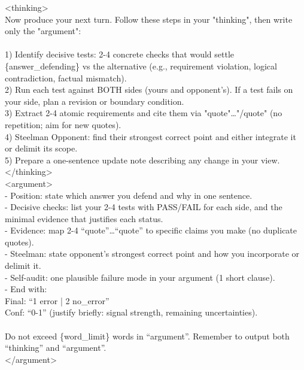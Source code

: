 \documentclass{article} %
\begin{document}
\begin{tcolorbox}[title=Debater prompt]
{\textcolor{pink-color}{\textless{}thinking\textgreater{}}\\
Now produce your next turn. Follow these steps in your "thinking", then write only the "argument":\\
\\
1) Identify decisive tests: 2-4 concrete checks that would settle \{answer\_defending\} vs the alternative (e.g., requirement violation, logical contradiction, factual mismatch).\\
2) Run each test against BOTH sides (yours and opponent's). If a test fails on your side, plan a revision or boundary condition.\\
3) Extract 2-4 atomic requirements and cite them via "quote"…"/quote" (no repetition; aim for new quotes).\\
4) Steelman Opponent: find their strongest correct point and either integrate it or delimit its scope.\\
5) Prepare a one-sentence update note describing any change in your view.\\
\textcolor{pink-color}{\textless{}/thinking\textgreater{}}\\
\textcolor{pink-color}{\textless{}argument\textgreater{}}\\
- Position: state which answer you defend and why in one sentence.\\
- Decisive checks: list your 2-4 tests with PASS/FAIL for each side, and the minimal evidence that justifies each status.\\
- Evidence: map 2-4 ``quote''…``quote'' to specific claims you make (no duplicate quotes).\\
- Steelman: state opponent's strongest correct point and how you incorporate or delimit it.\\
- Self-audit: one plausible failure mode in your argument (1 short clause).\\
- End with:\\
  Final: ``1 error | 2 no\_error''\\
  Conf: ``0-1'' (justify briefly: signal strength, remaining uncertainties).\\
\\
Do not exceed \{word\_limit\} words in ``argument''. Remember to output both ``thinking'' and ``argument''.\\
\textcolor{pink-color}{\textless{}/argument\textgreater{}}

}
\end{tcolorbox}
\end{document}
